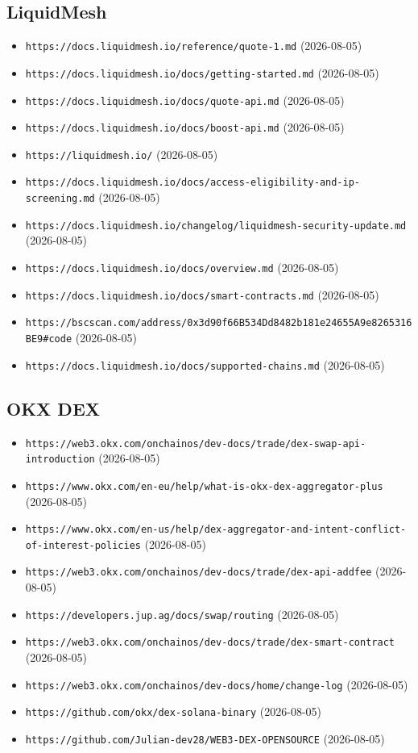 \subsection*{LiquidMesh}
\begin{itemize}\setlength{\itemsep}{0pt}\small
\item \texttt{https://docs.liquidmesh.io/reference/quote-1.md} (2026-08-05)
\item \texttt{https://docs.liquidmesh.io/docs/getting-started.md} (2026-08-05)
\item \texttt{https://docs.liquidmesh.io/docs/quote-api.md} (2026-08-05)
\item \texttt{https://docs.liquidmesh.io/docs/boost-api.md} (2026-08-05)
\item \texttt{https://liquidmesh.io/} (2026-08-05)
\item \texttt{https://docs.liquidmesh.io/docs/access-eligibility-and-ip-screening.md} (2026-08-05)
\item \texttt{https://docs.liquidmesh.io/changelog/liquidmesh-security-update.md} (2026-08-05)
\item \texttt{https://docs.liquidmesh.io/docs/overview.md} (2026-08-05)
\item \texttt{https://docs.liquidmesh.io/docs/smart-contracts.md} (2026-08-05)
\item \texttt{https://bscscan.com/address/0x3d90f66B534Dd8482b181e24655A9e8265316BE9\#code} (2026-08-05)
\item \texttt{https://docs.liquidmesh.io/docs/supported-chains.md} (2026-08-05)
\end{itemize}

\subsection*{OKX DEX}
\begin{itemize}\setlength{\itemsep}{0pt}\small
\item \texttt{https://web3.okx.com/onchainos/dev-docs/trade/dex-swap-api-introduction} (2026-08-05)
\item \texttt{https://www.okx.com/en-eu/help/what-is-okx-dex-aggregator-plus} (2026-08-05)
\item \texttt{https://www.okx.com/en-us/help/dex-aggregator-and-intent-conflict-of-interest-policies} (2026-08-05)
\item \texttt{https://web3.okx.com/onchainos/dev-docs/trade/dex-api-addfee} (2026-08-05)
\item \texttt{https://developers.jup.ag/docs/swap/routing} (2026-08-05)
\item \texttt{https://web3.okx.com/onchainos/dev-docs/trade/dex-smart-contract} (2026-08-05)
\item \texttt{https://web3.okx.com/onchainos/dev-docs/home/change-log} (2026-08-05)
\item \texttt{https://github.com/okx/dex-solana-binary} (2026-08-05)
\item \texttt{https://github.com/Julian-dev28/WEB3-DEX-OPENSOURCE} (2026-08-05)
\end{itemize}


